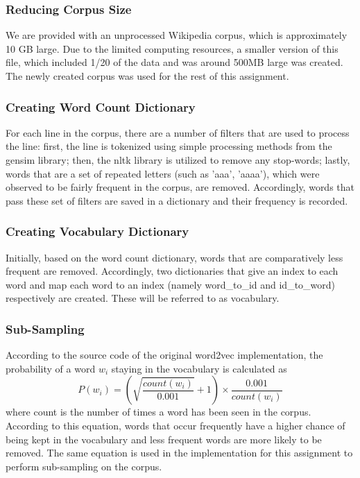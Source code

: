 \documentclass[12pt,a4paper]{article}
\begin{document}
	\subsubsection{Reducing Corpus Size}
	We are provided with an unprocessed Wikipedia corpus, which is approximately 10 GB large. Due to the limited computing resources, a smaller version of this file, which included 1/20 of the data and was around 500MB large was created. The newly created corpus was used for the rest of this assignment. 
	
	\subsubsection{Creating Word Count Dictionary}
	For each line in the corpus, there are a number of filters that are used to process the line: first, the line is tokenized using simple processing methods from the gensim library; then, the nltk library is utilized to remove any stop-words; lastly, words that are a set of repeated letters (such as 'aaa', 'aaaa'), which were observed to be fairly frequent in the corpus, are removed. Accordingly, words that pass these set of filters are saved in a dictionary and their frequency is recorded.
	
	\subsubsection{Creating Vocabulary Dictionary}
	Initially, based on the word count dictionary, words that are comparatively less frequent are removed. Accordingly, two dictionaries that give an index to each word and map each word to an index (namely word\_to\_id and id\_to\_word) respectively are created. These will be referred to as vocabulary.
	
	\subsubsection{Sub-Sampling}
	According to the source code of the original word2vec implementation, the probability of a word $w_i$ staying in the vocabulary is calculated as 
	\begin{equation}
		P(w_i) = (\sqrt{\frac{count(w_i)}{0.001}} +1 ) \times \frac{0.001}{count(w_i)}
	\end{equation}
	where count is the number of times a word has been seen in the corpus. According to this equation, words that occur frequently have a higher chance of being kept in the vocabulary and less frequent words are more likely to be removed. The same equation is used in the implementation for this assignment to perform sub-sampling on the corpus.
	
\end{document}
